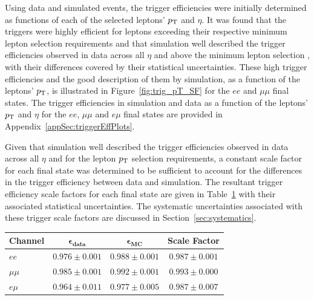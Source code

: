 Using data and simulated \ttbar events, the trigger efficiencies were initially determined as functions of each of the selected leptons' $p_{\mathrm{T}}$ and $\eta$.
It was found that the triggers were highly efficient for leptons exceeding their respective minimum lepton \pT selection requirements and that simulation well described the trigger efficiencies observed in data across all $\eta$ and above the minimum lepton selection \pT, with their differences covered by their statistical uncertainties.
These high trigger efficiencies and the good description of them by simulation, as a function of the leptons' $p_{\mathrm{T}}$, is illustrated in Figure~\ref{fig:trig_pT_SF} for the $ee$ and $\mu\mu$ final states.
The trigger efficiencies in simulation and data as a function of the leptons' $p_{\mathrm{T}}$ and $\eta$ for the $ee$, $\mu\mu$ and $e\mu$ final states are provided in Appendix~\ref{appSec:triggerEffPlots}.

Given that simulation well described the trigger efficiencies observed in data across all $\eta$ and for the lepton $p_{\mathrm{T}}$ selection requirements, a constant scale factor for each final state was determined to be sufficient to account for the differences in the trigger efficiency between data and simulation.
The resultant trigger efficiency scale factors for each final state are given in Table~\ref{tab:triggerSFs} with their associated statistical uncertainties.
The systematic uncertainties associated with these trigger scale factors are discussed in Section~\ref{sec:systematics}.

\begin{table}[htbp]
\label{tab:triggerSFs}
  \centering
 \begin{tabular}{lccc}
   \hline
   \textbf{Channel} & $\bm{\epsilon _{data}}$ & $\bm{\epsilon _{MC}}$ & \textbf{Scale Factor}\\
   \hline   
   $ee$ & $0.976 \pm 0.001 $& $0.988 \pm 0.001$ & $0.987 \pm 0.001$  \\
   $\mu\mu$ & $0.985 \pm 0.001$ & $0.992 \pm 0.001$ & $0.993 \pm 0.000$  \\
   $e \mu$ & $0.964 \pm 0.011$ & $0.977 \pm 0.005$ & $0.987 \pm 0.007 $ \\
   \hline
 \end{tabular}%
\end{table}

